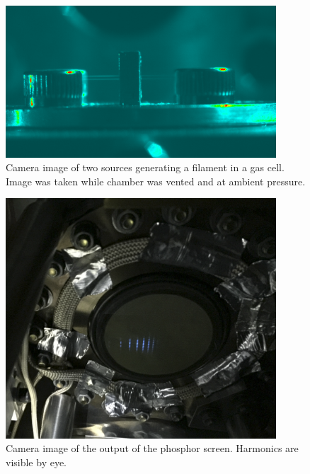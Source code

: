 \begin{figure}
	\centering
	\includegraphics[width=0.9\textwidth]{figures/Two_source/ts_filament_gas_cell.png}
	\caption{Camera image of two sources generating a filament in a gas cell. Image was taken while chamber was vented and at ambient pressure.}
	\label{ts_filament}
\end{figure}


\begin{figure}
	\centering
	\includegraphics[width=0.9\textwidth]{figures/Two_source/MCP_ts_harmonics.png}
	\caption{Camera image of the output of the phosphor screen.  Harmonics are visible by eye.}
	\label{MCP_ts_harmonics}
\end{figure}
